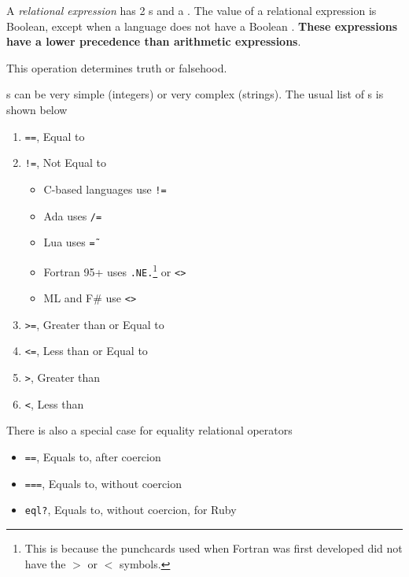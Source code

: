 \begin{definition}\label{def:Relational_Expression}
  A \emph{relational expression} has 2 s and a .
  The value of a relational expression is Boolean, except when a language does not have a Boolean .
  \textbf{These expressions have a lower precedence than arithmetic expressions}.

  This operation determines truth or falsehood.
\end{definition}

s can be very simple (integers) or very complex (strings).
The usual list of s is shown below
\begin{enumerate}[noitemsep]
\item \texttt{==}, Equal to
\item \texttt{!=}, Not Equal to
  \begin{itemize}[noitemsep]
  \item C-based languages use \texttt{!=}
  \item Ada uses \texttt{/=}
  \item Lua uses \texttt{\~=}
  \item Fortran 95+ uses \texttt{.NE.}\footnote{This is because the punchcards used when Fortran was first developed did not have the $>$ or $<$ symbols.} or \texttt{<>}
  \item ML and F\# use \texttt{<>}
  \end{itemize}
\item \texttt{>=}, Greater than or Equal to
\item \texttt{<=}, Less than or Equal to
\item \texttt{>}, Greater than
\item \texttt{<}, Less than
\end{enumerate}

There is also a special case for equality relational operators
\begin{itemize}[noitemsep]
\item \texttt{==}, Equals to, after  coercion
\item \texttt{===}, Equals to, without  coercion
\item \texttt{eql?}, Equals to, without  coercion, for Ruby
\end{itemize}

